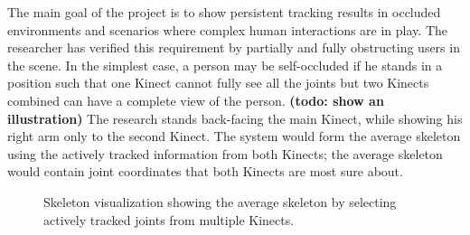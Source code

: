 The main goal of the project is to show persistent tracking results in occluded environments and scenarios where complex human interactions are in play. The researcher has verified this requirement by partially and fully obstructing users in the scene. In the simplest case, a person may be self-occluded if he stands in a position such that one Kinect cannot fully see all the joints but two Kinects combined can have a complete view of the person. \textbf{(todo: show an illustration)} The research stands back-facing the main Kinect, while showing his right arm only to the second Kinect. The system would form the average skeleton using the actively tracked information from both Kinects; the average skeleton would contain joint coordinates that both Kinects are most sure about.


\begin{figure}[!h]
  \centering

  \caption{Skeleton visualization showing the average skeleton by selecting actively tracked joints from multiple Kinects.}
  
  \label{fig:occlusion_fill_in_gaps}
\end{figure}


